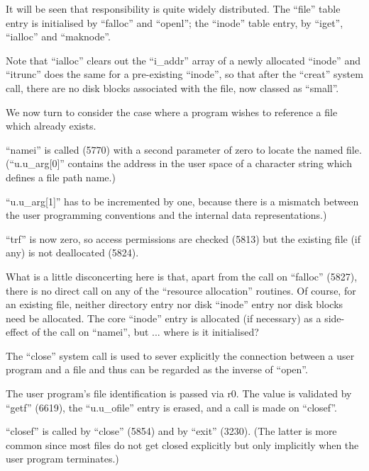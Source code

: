 It will be seen that responsibility is
quite widely distributed. The ``file''
table entry is initialised by ``falloc''
and ``openl''; the ``inode'' table entry,
by ``iget'', ``ialloc'' and ``maknode''.

Note that ``ialloc'' clears out the
``i\_addr'' array of a newly allocated
``inode'' and ``itrunc'' does the same for
a pre-existing ``inode'', so that after
the ``creat'' system call, there are no
disk blocks associated with the file,
now classed as ``small''.



We now turn to consider the case where
a program wishes to reference a file
which already exists.

``namei'' is called (5770) with a second
parameter of zero to locate the named
file. (``u.u\_arg[0]'' contains the
address in the user space of a character string which defines a file path
name.)

``u.u\_arg[1]'' has to be incremented by
one, because there is a mismatch
between the user programming conventions and the internal data representations.)



``trf'' is now zero, so access permissions are checked (5813) but the existing file (if any) is not deallocated
(5824).

What is a little disconcerting here is
that, apart from the call on ``falloc''
(5827), there is no direct call on any
of the ``resource allocation'' routines.
Of course, for an existing file, neither directory entry nor disk ``inode''
entry nor disk blocks need be allocated. The core ``inode'' entry is allocated (if necessary) as a side-effect
of the call on ``namei'', but ... where
is it initialised?



The ``close'' system call is used to
sever explicitly the connection between
a user program and a file and thus can
be regarded as the inverse of ``open''.


The user program's file identification
is passed via r0. The value is validated by
``getf'' (6619), the ``u.u\_ofile''
entry is erased, and a call is made on ``closef''.



``closef'' is called by ``close'' (5854)
and by ``exit'' (3230). (The latter is
more common since most files do not get
closed explicitly but only implicitly
when the user program terminates.)


